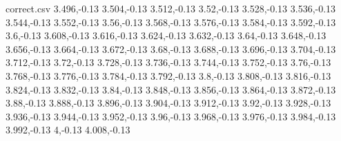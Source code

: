 \begin{filecontents*}{correct.csv}
3.496,-0.13
3.504,-0.13
3.512,-0.13
3.52,-0.13
3.528,-0.13
3.536,-0.13
3.544,-0.13
3.552,-0.13
3.56,-0.13
3.568,-0.13
3.576,-0.13
3.584,-0.13
3.592,-0.13
3.6,-0.13
3.608,-0.13
3.616,-0.13
3.624,-0.13
3.632,-0.13
3.64,-0.13
3.648,-0.13
3.656,-0.13
3.664,-0.13
3.672,-0.13
3.68,-0.13
3.688,-0.13
3.696,-0.13
3.704,-0.13
3.712,-0.13
3.72,-0.13
3.728,-0.13
3.736,-0.13
3.744,-0.13
3.752,-0.13
3.76,-0.13
3.768,-0.13
3.776,-0.13
3.784,-0.13
3.792,-0.13
3.8,-0.13
3.808,-0.13
3.816,-0.13
3.824,-0.13
3.832,-0.13
3.84,-0.13
3.848,-0.13
3.856,-0.13
3.864,-0.13
3.872,-0.13
3.88,-0.13
3.888,-0.13
3.896,-0.13
3.904,-0.13
3.912,-0.13
3.92,-0.13
3.928,-0.13
3.936,-0.13
3.944,-0.13
3.952,-0.13
3.96,-0.13
3.968,-0.13
3.976,-0.13
3.984,-0.13
3.992,-0.13
4,-0.13
4.008,-0.13
\end{filecontents*}